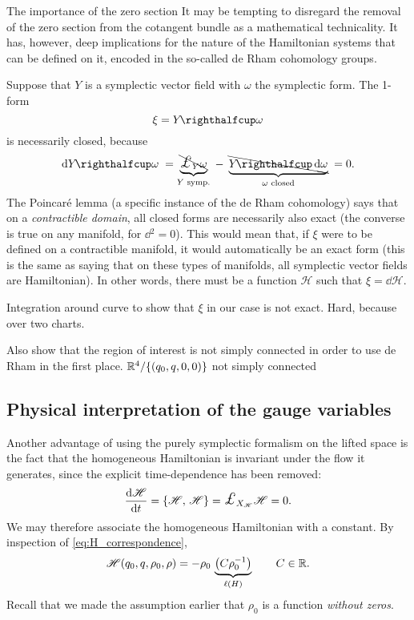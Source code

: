 
\begin{mathbox}{The importance of the zero section}
    It may be tempting to disregard the removal of the zero section from the cotangent bundle as a mathematical technicality. It has, however, deep implications for the nature of the Hamiltonian systems that can be defined on it, encoded in the so-called de Rham cohomology groups.
    
    Suppose that $Y$ is a symplectic vector field with $\omega$ the symplectic form. The 1-form
    $$\xi = \intpr{Y}{\omega}$$
    is necessarily closed, because
    $$ \dd{\intpr{Y}{\omega}} \; = \underbrace{\bcancel{\lied{Y}{\omega}}}_{Y \text{ symp.}}\;- \; \underbrace{\bcancel{\intpr{Y}{\dd{\omega}}}}_{\omega \text{ closed}}\; = 0. $$
    The Poincaré lemma (a specific instance of the de Rham cohomology) says that on a \emph{contractible domain}, all closed forms are necessarily also exact (the converse is true on any manifold, for $\dd{}^2 = 0$). This would mean that, if $\xi$ were to be defined on a contractible manifold, it would automatically be an exact form (this is the same as saying that on these types of manifolds, all symplectic vector fields are Hamiltonian). In other words, there must be a function $\mathscr{H}$ such that $\xi = \dd{\mathscr{H}}$.

    Integration around curve to show that $\xi$ in our case is not exact. Hard, because over two charts.

    Also show that the region of interest is not simply connected in order to use de Rham in the first place.
    $ \mathbb{R}^4 / \{(q_0, q, 0, 0)\} $ not simply connected
\end{mathbox}

\subsection{Physical interpretation of the gauge variables}
Another advantage of using the purely symplectic formalism on the lifted space is the fact that the homogeneous Hamiltonian is invariant under the flow it generates, since the explicit time-dependence has been removed:
$$ \dv{\mathscr{H}}{t} = \poisson{\mathscr{H}}{\mathscr{H}} = \lied{X_{\mathscr{H}}}{\mathscr{H}} = 0. $$
We may therefore associate the homogeneous Hamiltonian with a constant. By inspection of \cref{eq:H_correspondence}, 
$$ \mathscr{H}(q_0, q, \rho_0, \rho) = -\rho_0\,\underbrace{\qty(C\rho_0^{-1})}_{\ell(H)} \qquad C \in \mathbb{R}.$$
Recall that we made the assumption earlier that $\rho_0$ is a function \emph{without zeros}. 

